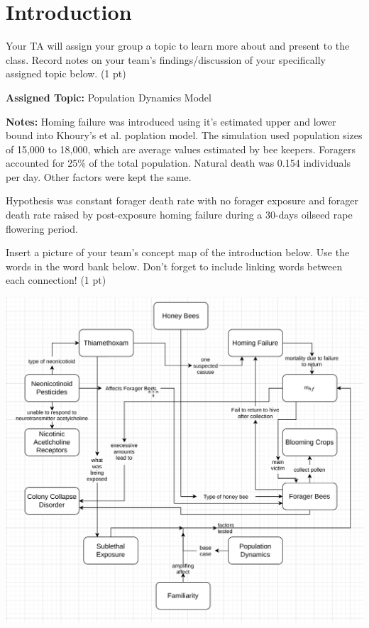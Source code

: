 \documentclass[12pt,a4paper]{article}
\begin{document}
\section*{Introduction}
\begin{enumerate}[font=\bfseries, wide]
    {\color{under}\item Your TA will assign your group a topic to learn more about and present to the class. Record notes on your team’s findings/discussion of your specifically assigned topic below. (1 pt)}
    
    \textbf{Assigned Topic:} Population Dynamics Model

    \textbf{Notes:} Homing failure was introduced using it's estimated upper and lower bound into Khoury's et al. poplation model. The simulation used population sizes of 15,000 to 18,000, which are average values estimated by bee keepers. Foragers accounted for 25\% of the total population. Natural death was 0.154 individuals per day. Other factors were kept the same. 

    Hypothesis was constant forager death rate with no forager exposure and forager death rate raised by post-exposure homing failure during a 30-days oilseed rape flowering period. 
    
    {\color{under}\item Insert a picture of your team’s concept map of the introduction below. Use the words in the word bank below. Don’t forget to include linking words between each connection!   (1 pt)}
    
    \begin{center}
        \includegraphics[scale=0.33]{images/map.png}
    \end{center}
    \vspace{-1cm}
    

\end{enumerate}
\end{document}
